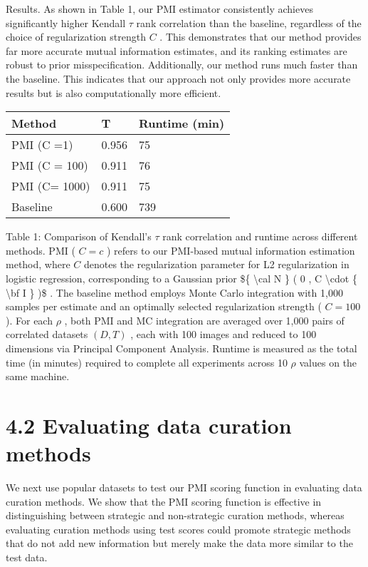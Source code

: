 Results. As shown in Table 1, our PMI estimator consistently achieves
significantly higher Kendall \(\tau\) rank correlation than the
baseline, regardless of the choice of regularization strength \(C\) .
This demonstrates that our method provides far more accurate mutual
information estimates, and its ranking estimates are robust to prior
misspecification. Additionally, our method runs much faster than the
baseline. This indicates that our approach not only provides more
accurate results but is also computationally more efficient.

\begin{longtable}[]{@{}|l|l|l|@{}}
\toprule\noalign{}
\endhead
\bottomrule\noalign{}
\endlastfoot
\hline
Method & T & Runtime (min) \\
\hline
PMI (C =1) & 0.956 & 75 \\
\hline
PMI (C = 100) & 0.911 & 76 \\
\hline
PMI (C= 1000) & 0.911 & 75 \\
\hline
Baseline & 0.600 & 739 \\
\hline
\end{longtable}

Table 1: Comparison of Kendall's \(\tau\) rank correlation and runtime
across different methods. PMI ( \(C = c\) ) refers to our PMI-based
mutual information estimation method, where \(C\) denotes the
regularization parameter for L2 regularization in logistic regression,
corresponding to a Gaussian prior {\$\{ \textbackslash cal N \} ( 0 , C
\textbackslash cdot \{ \textbackslash bf I \} )\$} . The baseline method
employs Monte Carlo integration with 1,000 samples per estimate and an
optimally selected regularization strength ( \(C = 1 0 0\) ). For each
\(\rho\) , both PMI and MC integration are averaged over 1,000 pairs of
correlated datasets \(( D , T )\) , each with 100 images and reduced to
100 dimensions via Principal Component Analysis. Runtime is measured as
the total time (in minutes) required to complete all experiments across
10 \(\rho\) values on the same machine.

\section{4.2 Evaluating data curation
methods}\label{evaluating-data-curation-methods}

We next use popular datasets to test our PMI scoring function in
evaluating data curation methods. We show that the PMI scoring function
is effective in distinguishing between strategic and non-strategic
curation methods, whereas evaluating curation methods using test scores
could promote strategic methods that do not add new information but
merely make the data more similar to the test data.

